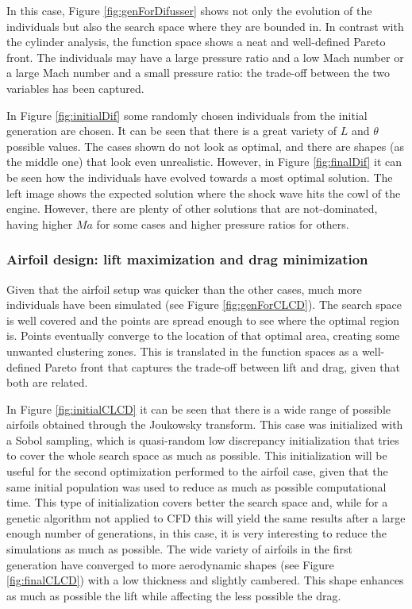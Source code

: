 In this case, Figure \ref{fig:genForDifusser} shows not only the evolution of the individuals but also the search space where they are bounded in. In contrast with the cylinder analysis, the function space shows a neat and well-defined Pareto front. The individuals may have a large pressure ratio and a low Mach number or a large Mach number and a small pressure ratio: the trade-off between the two variables has been captured.

In Figure \ref{fig:initialDif} some randomly chosen individuals from the initial generation are chosen. It can be seen that there is a great variety of $L$ and $\theta$ possible values. The cases shown do not look as optimal, and there are shapes (as the middle one) that look even unrealistic. However, in Figure \ref{fig:finalDif} it can be seen how the individuals have evolved towards a most optimal solution. The left image shows the expected solution where the shock wave hits the cowl of the engine. However, there are plenty of other solutions that are not-dominated, having higher $Ma$ for some cases and higher pressure ratios for others. 

\subsubsection*{Airfoil design: lift maximization and drag minimization}


Given that the airfoil setup was quicker than the other cases, much more individuals have been simulated (see Figure \ref{fig:genForCLCD}). The search space is well covered and the points are spread enough to see where the optimal region is. Points eventually converge to the location of that optimal area, creating some unwanted clustering zones. This is translated in the function spaces as a well-defined Pareto front that captures the trade-off between lift and drag, given that both are related. 

In Figure \ref{fig:initialCLCD} it can be seen that there is a wide range of possible airfoils obtained through the Joukowsky transform. This case was initialized with a Sobol sampling, which is quasi-random low discrepancy initialization that tries to cover the whole search space as much as possible. This initialization will be useful for the second optimization performed to the airfoil case, given that the same initial population was used to reduce as much as possible computational time. This type of initialization covers better the search space and, while for a genetic algorithm not applied to CFD this will yield the same results after a large enough number of generations, in this case, it is very interesting to reduce the simulations as much as possible. The wide variety of airfoils in the first generation have converged to more aerodynamic shapes (see Figure \ref{fig:finalCLCD}) with a low thickness and slightly cambered. This shape enhances as much as possible the lift while affecting the less possible the drag. 


